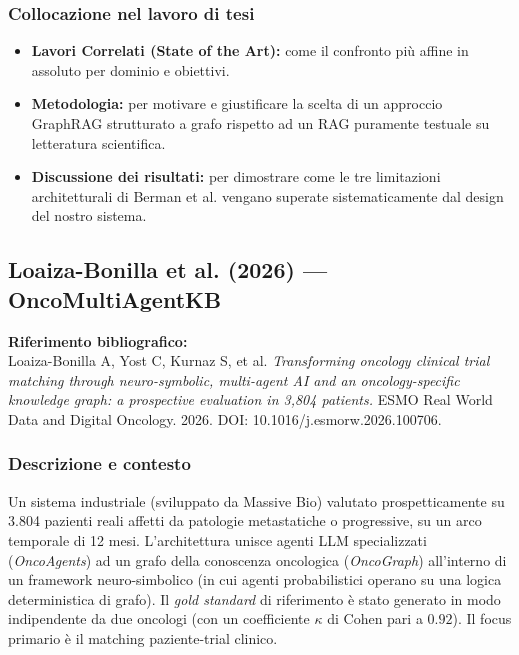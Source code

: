 \documentclass[11pt,a4paper]{article}
\begin{document}
\subsubsection*{Collocazione nel lavoro di tesi}
\begin{itemize}
  \item \textbf{Lavori Correlati (State of the Art):} come il confronto più affine in assoluto per dominio e obiettivi.
  \item \textbf{Metodologia:} per motivare e giustificare la scelta di un approccio GraphRAG strutturato a grafo rispetto ad un RAG puramente testuale su letteratura scientifica.
  \item \textbf{Discussione dei risultati:} per dimostrare come le tre limitazioni architetturali di Berman et al. vengano superate sistematicamente dal design del nostro sistema.
\end{itemize}

\subsection{Loaiza-Bonilla et al. (2026) --- OncoMultiAgentKB}

\noindent\textbf{Riferimento bibliografico:}\\
Loaiza-Bonilla A, Yost C, Kurnaz S, et al. \textit{Transforming oncology clinical trial matching through neuro-symbolic, multi-agent AI and an oncology-specific knowledge graph: a prospective evaluation in 3,804 patients.} ESMO Real World Data and Digital Oncology. 2026. DOI: 10.1016/j.esmorw.2026.100706.

\subsubsection*{Descrizione e contesto}
Un sistema industriale (sviluppato da Massive Bio) valutato prospetticamente su 3.804 pazienti reali affetti da patologie metastatiche o progressive, su un arco temporale di 12 mesi. L'architettura unisce agenti LLM specializzati (\emph{OncoAgents}) ad un grafo della conoscenza oncologica (\emph{OncoGraph}) all'interno di un framework neuro-simbolico (in cui agenti probabilistici operano su una logica deterministica di grafo). Il \emph{gold standard} di riferimento è stato generato in modo indipendente da due oncologi (con un coefficiente $\kappa$ di Cohen pari a $0.92$). Il focus primario è il matching paziente-trial clinico.
\end{document}
